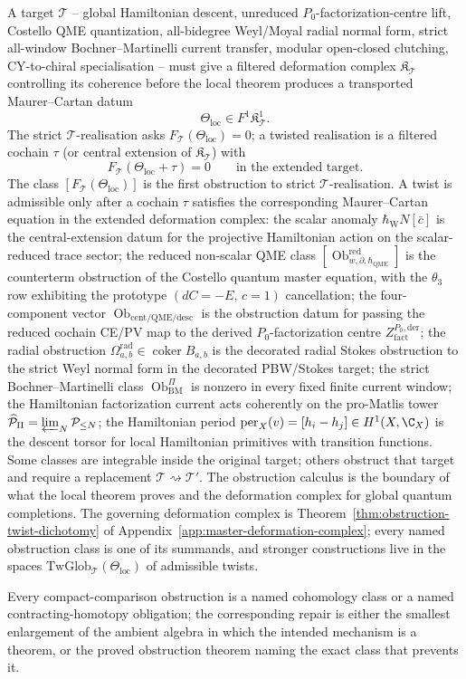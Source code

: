 A target \(\mathcal T\) -- global Hamiltonian descent, unreduced
\(P_0\)-factorization-centre lift, Costello QME quantization,
all-bidegree Weyl/Moyal radial normal form, strict all-window
Bochner--Martinelli current transfer, modular open-closed clutching,
CY-to-chiral specialisation -- must give a filtered deformation
complex \(\mathfrak K_{\mathcal T}\) controlling its coherence before
the local theorem produces a transported Maurer--Cartan datum
\[
  \Theta_{\mathrm{loc}}\in F^1\mathfrak K^1_{\mathcal T} .
\]
The strict \(\mathcal T\)-realisation asks
\(F_{\mathcal T}(\Theta_{\mathrm{loc}})=0\); a twisted realisation is a
filtered cochain \(\tau\) (or central extension of
\(\mathfrak K_{\mathcal T}\)) with
\[
  F_{\mathcal T}(\Theta_{\mathrm{loc}}+\tau)=0
  \qquad\text{in the extended target.}
\]
The class \([F_{\mathcal T}(\Theta_{\mathrm{loc}})]\) is the first
obstruction to strict \(\mathcal T\)-realisation.  A twist is admissible
only after a cochain \(\tau\) satisfies the corresponding
Maurer--Cartan equation in the extended deformation complex: the scalar
anomaly \(\hbar_{\mathrm{W}}N[\bar c]\) is the central-extension datum for the
projective Hamiltonian action on the scalar-reduced trace sector; the
reduced non-scalar QME class
\([\operatorname{Ob}^{\mathrm{red}}_{w,\partial,\hbar_{\mathrm{QME}}}]\) is the
counterterm obstruction of the Costello quantum master equation, with
the \(\theta_3\) row exhibiting the prototype
\((dC=-E,\,c=1)\) cancellation; the four-component vector
\(\operatorname{Ob}_{\mathrm{cent/QME/desc}}\) is the obstruction datum
for passing the reduced cochain CE/PV map to the derived
\(P_0\)-factorization centre \(Z^{P_0,\mathrm{der}}_{\mathrm{fact}}\);
the radial obstruction
\(\Omega^{\mathrm{rad}}_{a,b}\in\operatorname{coker}B_{a,b}\) is the
decorated radial Stokes obstruction to the strict Weyl normal form in
the decorated PBW/Stokes target; the strict Bochner--Martinelli
class \(\operatorname{Ob}^{\Pi}_{\mathrm{BM}}\) is nonzero in every
fixed finite current window; the Hamiltonian factorization current
acts coherently on the pro-Matlis tower
\(\widehat{\mathcal P}_\Pi=\varprojlim_N\mathcal P_{\le N}\);
the Hamiltonian period \(\mathrm{per}_X(v)=[h_i-h_j]\in H^1(X,\C_X)\)
is the descent torsor for local Hamiltonian primitives with transition
functions.  Some classes are integrable inside the original target;
others obstruct that target and require a replacement
\(\mathcal T\rightsquigarrow\mathcal T'\).  The obstruction calculus is
the boundary of what the local theorem proves and the deformation
complex for global quantum completions.  The governing deformation complex is
Theorem~\ref{thm:obstruction-twist-dichotomy} of
Appendix~\ref{app:master-deformation-complex}; every named obstruction
class is one of its summands, and stronger constructions live in
the spaces \(\mathrm{TwGlob}_{\mathcal T}(\Theta_{\mathrm{loc}})\) of
admissible twists.

Every compact-comparison obstruction is a named cohomology class or a named
contracting-homotopy obligation; the corresponding repair is either
the smallest enlargement of the ambient algebra in which the intended
mechanism is a theorem, or the proved obstruction theorem naming the
exact class that prevents it.
